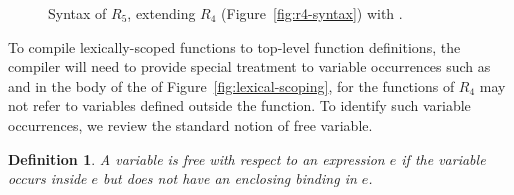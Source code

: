 \documentclass[11pt]{book}
\newcommand{\gray}[1]{{\color{gray} #1}}
\newtheorem{definition}[theorem]{Definition}
\begin{document}
\begin{figure}[tp]
\centering
\fbox{
\begin{minipage}{0.96\textwidth}
\[
\begin{array}{lcl}
  \Type &::=& \gray{\key{Integer} \mid \key{Boolean}
     \mid (\key{Vector}\;\Type^{+}) \mid \key{Void}
     \mid (\Type^{*} \; \key{->}\; \Type)} \\
  \Exp &::=& \gray{\Int \mid (\key{read}) \mid (\key{-}\;\Exp)
     \mid (\key{+} \; \Exp\;\Exp) \mid (\key{-} \; \Exp\;\Exp)}  \\
    &\mid&  \gray{\Var \mid \LET{\Var}{\Exp}{\Exp}}\\
    &\mid& \gray{\key{\#t} \mid \key{\#f} 
     \mid (\key{and}\;\Exp\;\Exp) 
     \mid (\key{or}\;\Exp\;\Exp) 
     \mid (\key{not}\;\Exp) } \\
    &\mid& \gray{(\key{eq?}\;\Exp\;\Exp) \mid \IF{\Exp}{\Exp}{\Exp}} \\
    &\mid& \gray{(\key{vector}\;\Exp^{+}) \mid
          (\key{vector-ref}\;\Exp\;\Int)} \\
    &\mid& \gray{(\key{vector-set!}\;\Exp\;\Int\;\Exp)\mid (\key{void})} \\
    &\mid& \gray{(\Exp \; \Exp^{*})} \\
    &\mid& (\key{lambda:}\; ([\Var \key{:} \Type]^{*}) \key{:} \Type \; \Exp) \\
  \Def &::=& \gray{(\key{define}\; (\Var \; [\Var \key{:} \Type]^{*}) \key{:} \Type \; \Exp)} \\
  R_5 &::=& \gray{(\key{program} \; \Def^{*} \; \Exp)}
\end{array}
\]
\end{minipage}
}
\caption{Syntax of $R_5$, extending $R_4$ (Figure~\ref{fig:r4-syntax}) 
  with .}
\label{fig:r5-syntax}
\end{figure}

To compile lexically-scoped functions to top-level function
definitions, the compiler will need to provide special treatment to
variable occurrences such as  and  in the body of the
 of Figure~\ref{fig:lexical-scoping}, for the functions
of $R_4$ may not refer to variables defined outside the function. To
identify such variable occurrences, we review the standard notion of
free variable.

\begin{definition}
A variable is \emph{free with respect to an expression} $e$ if the
variable occurs inside $e$ but does not have an enclosing binding in
$e$.
\end{definition}
\end{document}
